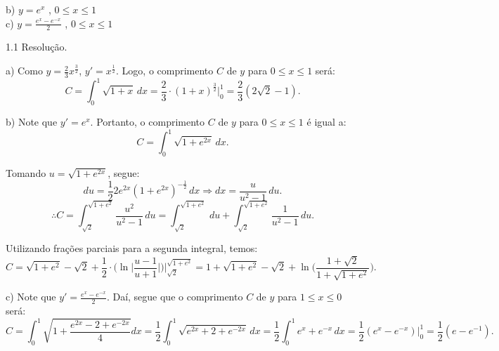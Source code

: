 \documentclass{article}
\begin{document}
{\begin{newpage}
\begin{multicols}{3}
b) $\displaystyle{y = e^{x}}$ , $\displaystyle{0\leq x\leq 1}$\\
c) $\displaystyle{y = \frac{e^x - e^{-x}}{2}}$ , $\displaystyle{0\leq x\leq 1}$
\end{multicols}
\vspace{0.3cm}
\par
\begin{flushleft}
1.1 Resolução.
\end{flushleft}
\par a) Como $y=\displaystyle{\frac{2}{3}x^{\frac{3}{2}}}$, $y' = \displaystyle{x^{\frac{1}{2}}}$. Logo, o comprimento $C$ de $y$ para $0\leq x\leq 1$ será:
\begin{equation*}\displaystyle{C = \int_{0}^{1} \sqrt{1 + x}\, dx = \frac{2}{3}\cdot (1+x)^{\frac{3}{2}}\Big|_{0}^{1} = \frac{2}{3} (2\sqrt{2} - 1).}\end{equation*}
\par
\vspace{0.3cm}
b) Note que $y' = e^{x}$. Portanto, o comprimento $C$ de $y$ para $0\leq x\leq 1$ é igual a:
\begin{equation*}\displaystyle{C = \int_{0}^{1} \sqrt{1 + e^{2x}}\, dx}.\end{equation*}
\par Tomando $u = \displaystyle{\sqrt{1 + e^{2x}}}$, segue:
\begin{equation*}\displaystyle{du = \frac{1}{2}2e^{2x}(1 + e^{2x})^{-\frac{1}{2}}\, dx \Rightarrow dx = \frac{u}{u^{2} - 1}\, du.}\end{equation*}
$$\displaystyle{\therefore C = \int_{\sqrt{2}}^{\sqrt{1 + e^{2}}} \frac{u^{2}}{u^{2} - 1}\, du = \int_{\sqrt{2}}^{\sqrt{1+e^{2}}}\, du + \int_{\sqrt{2}}^{\sqrt{1+e^{2}}} \frac{1}{u^{2} - 1}\, du.}$$
\par Utilizando frações parciais para a segunda integral, temos:
$$\displaystyle{C = \sqrt{1 + e^{2}} - \sqrt{2} + \frac{1}{2}\cdot\Big(\ln{\Big|\frac{u-1}{u+1}\Big|}\Big)\Big|_{\sqrt{2}}^{\sqrt{1+e^{2}}} = 1 + \sqrt{1 + e^{2}} - \sqrt{2} + \ln{\Big(\frac{1 + \sqrt{2}}{1 + \sqrt{1+e^{2}}}\Big)} .}$$        
\par
\vspace{0.3cm}
c) Note que $y' = \displaystyle{\frac{e^x - e^{-x}}{2}}$. Daí, segue que o comprimento $C$ de $y$ para $1\leq x\leq 0$ será:
\begin{equation*}\displaystyle{C = \int_{0}^{1} \sqrt{1 + \frac{e^{2x} - 2 + e^{-2x}}{4}} dx = \frac{1}{2}\int_{0}^{1} \sqrt{e^{2x} + 2 + e^{-2x}}\, dx = \frac{1}{2}\int_{0}^{1} e^x + e^{-x}\, dx = \frac{1}{2} (e^{x} - e^{-x})\Big|_{0}^{1} = \frac{1}{2}(e - e^{-1}).}\end{equation*}
\par
\vspace{0.3cm}

\end{newpage}}
\end{document}
